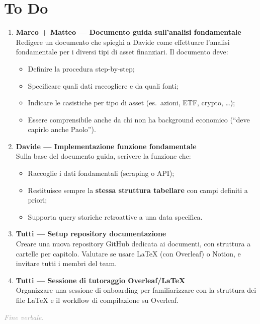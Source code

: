 \documentclass[12pt, a4paper]{article}
\begin{document}
\vspace{0.5cm}

\section{To Do}

\begin{enumerate}[leftmargin=1.5cm, label=\textbf{\arabic*.}]

  \item \textbf{Marco + Matteo — Documento guida sull'analisi fondamentale}\\
  Redigere un documento che spieghi a Davide come effettuare l'analisi fondamentale per i diversi tipi di asset finanziari. Il documento deve:
  \begin{itemize}
    \item Definire la procedura step-by-step;
    \item Specificare quali dati raccogliere e da quali fonti;
    \item Indicare le casistiche per tipo di asset (es.\ azioni, ETF, crypto, \dots);
    \item Essere comprensibile anche da chi non ha background economico (``deve capirlo anche Paolo'').
  \end{itemize}

  \item \textbf{Davide — Implementazione funzione fondamentale}\\
  Sulla base del documento guida, scrivere la funzione che:
  \begin{itemize}
    \item Raccoglie i dati fondamentali (scraping o API);
    \item Restituisce sempre la \textbf{stessa struttura tabellare} con campi definiti a priori;
    \item Supporta query storiche retroattive a una data specifica.
  \end{itemize}

  \item \textbf{Tutti — Setup repository documentazione}\\
  Creare una nuova repository GitHub dedicata ai documenti, con struttura a cartelle per capitolo. Valutare se usare \LaTeX{} (con Overleaf) o Notion, e invitare tutti i membri del team.

  \item \textbf{Tutti — Sessione di tutoraggio Overleaf/\LaTeX}\\
  Organizzare una sessione di onboarding per familiarizzare con la struttura dei file \LaTeX{} e il workflow di compilazione su Overleaf.

\end{enumerate}

\vspace{1cm}
\noindent\textcolor{darkgray}{\textit{Fine verbale.}}
\end{document}
